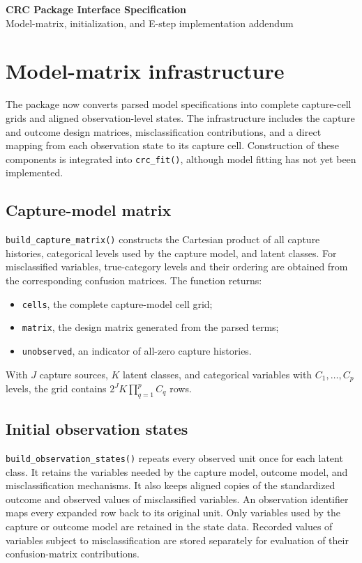 \documentclass[11pt,letterpaper]{article}
\begin{document}
\begin{center}
  {\Large\bfseries CRC Package Interface Specification}\\[3pt]
  {\large Model-matrix, initialization, and E-step implementation addendum}
\end{center}

\section{Model-matrix infrastructure}

The package now converts parsed model specifications into complete capture-cell
grids and aligned observation-level states. The infrastructure includes the
capture and outcome design matrices, misclassification contributions, and a
direct mapping from each observation state to its capture cell. Construction
of these components is integrated into \texttt{crc\_fit()}, although model
fitting has not yet been implemented.

\subsection{Capture-model matrix}

\texttt{build\_capture\_matrix()} constructs the Cartesian product of all
capture histories, categorical levels used by the capture model, and latent
classes. For misclassified variables, true-category levels and their ordering
are obtained from the corresponding confusion matrices. The function returns:

\begin{itemize}
  \item \texttt{cells}, the complete capture-model cell grid;
  \item \texttt{matrix}, the design matrix generated from the parsed terms;
  \item \texttt{unobserved}, an indicator of all-zero capture histories.
\end{itemize}

With $J$ capture sources, $K$ latent classes, and categorical variables with
$C_1,\ldots,C_p$ levels, the grid contains
$2^J K\prod_{q=1}^p C_q$ rows.

\subsection{Initial observation states}

\texttt{build\_observation\_states()} repeats every observed unit once for
each latent class. It retains the variables needed by the capture model,
outcome model, and misclassification mechanisms. It also keeps aligned copies
of the standardized outcome and observed values of misclassified variables.
An observation identifier maps every expanded row back to its original unit.
Only variables used by the capture or outcome model are retained in the state
data. Recorded values of variables subject to misclassification are stored
separately for evaluation of their confusion-matrix contributions.
\end{document}
